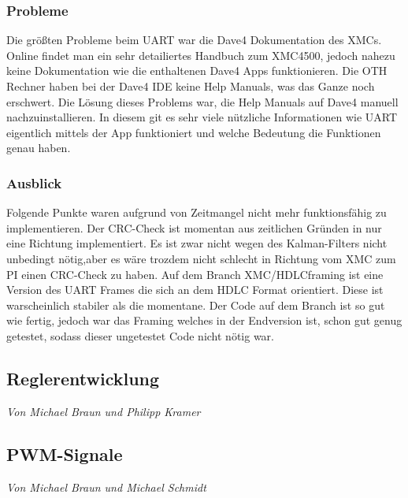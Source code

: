 \documentclass[12pt,a4paper,bibliography=totoc,listof=totoc]{scrartcl}
\begin{document}
\subsubsection{Probleme}
Die größten Probleme beim UART war die Dave4 Dokumentation des XMCs. Online findet man ein sehr detailiertes Handbuch zum 
XMC4500, jedoch nahezu keine Dokumentation wie die enthaltenen Dave4 Apps funktionieren. Die OTH Rechner haben bei der Dave4 IDE keine 
Help Manuals, was das Ganze noch erschwert. Die Lösung dieses Problems war, die Help Manuals auf Dave4 manuell 
nachzuinstallieren. In diesem git es sehr viele nützliche Informationen wie UART eigentlich mittels der App funktioniert und welche Bedeutung die Funktionen genau haben.

\subsubsection{Ausblick}
Folgende Punkte waren aufgrund von Zeitmangel nicht mehr funktionsfähig zu implementieren.
Der CRC-Check ist momentan aus zeitlichen Gründen in nur eine Richtung implementiert. Es ist zwar nicht wegen des Kalman-Filters nicht unbedingt nötig,aber
 es wäre trozdem nicht schlecht in Richtung vom XMC zum PI einen CRC-Check zu haben. 
Auf dem Branch XMC/HDLCframing ist eine Version des UART Frames die sich an dem HDLC Format orientiert. Diese 
ist warscheinlich stabiler als die momentane. Der Code auf dem Branch ist so gut wie fertig, jedoch war das Framing welches 
in der Endversion ist, schon gut genug getestet, sodass dieser ungetestet Code nicht nötig war.
\subsection{Reglerentwicklung}
\textit{Von Michael Braun und Philipp Kramer}\newline

\subsection{PWM-Signale}
\textit{Von Michael Braun und Michael Schmidt}\newline
\end{document}
